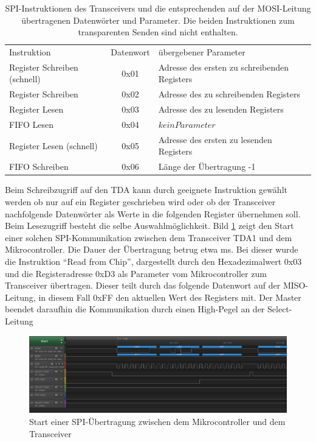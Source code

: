 \begin{table}[tbh]
	\centering
	\begin{tabular}{lcl}
		
		Instruktion & Datenwort & übergebener Parameter  \\
		Register Schreiben (schnell) & 0x01 & Adresse des ersten zu schreibenden Registers   \\
		Register Schreiben & 0x02 & Adresse des zu schreibenden Registers   \\  
		Register Lesen & 0x03 & Adresse des zu lesenden Registers   \\  
		FIFO Lesen & 0x04 &  $kein Parameter$ \\  
		Register Lesen (schnell) & 0x05 & Adresse des ersten zu lesenden Registers   \\  
		FIFO Schreiben & 0x06 & Länge der Übertragung -1   \\  
	\end{tabular}
	\caption{SPI-Instruktionen des Transceivers und die entsprechenden auf der MOSI-Leitung übertragenen Datenwörter und Parameter. Die beiden Instruktionen zum transparenten Senden sind nicht enthalten. }
	\label{tab:SPIcommands}
\end{table}







Beim Schreibzugriff auf den TDA kann durch geeignete Instruktion gewählt werden ob nur auf ein Register geschrieben wird oder ob der Transceiver nachfolgende Datenwörter als Werte in die folgenden Register übernehmen soll. 
Beim Lesezugriff besteht die selbe Auswahlmöglichkeit. Bild \ref{fig:spistart} zeigt den Start einer solchen \ac{SPI}-Kommunikation zwischen dem Transceiver TDA1 und dem Mikrocontroller. Die Dauer der Übertragung betrug etwa \unit[0,26]{ms}. Bei dieser wurde die Instruktion \enquote{Read from Chip}, dargestellt durch den Hexadezimalwert 0x03 und die Registeradresse 0xD3 als Parameter vom Mikrocontroller zum Transceiver übertragen. Dieser teilt durch das folgende Datenwort auf der \ac{MISO}-Leitung, in diesem Fall 0xFF den aktuellen Wert des Registers mit. Der Master beendet daraufhin die Kommunikation durch einen High-Pegel an der Select-Leitung


\begin{figure}[h]
\centering
\includegraphics[width=\linewidth,trim=0cm 2.9cm 4.5cm 0cm,clip=true]{"Abbildungen/Aufnahmen/Bilder/Logic Analyser/SPI_Start"}
\caption{Start einer SPI-Übertragung zwischen dem Mikrocontroller und dem Transceiver}
\label{fig:spistart}
\end{figure}


